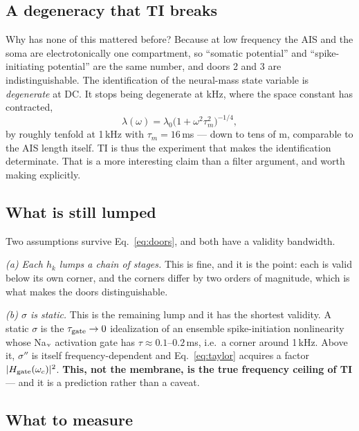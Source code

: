 \documentclass[11pt,a4paper]{article}
\begin{document}
\subsection{A degeneracy that TI breaks}

Why has none of this mattered before? Because at low frequency the AIS and the soma are electrotonically
one compartment, so ``somatic potential'' and ``spike-initiating potential'' are the same number, and
doors 2 and 3 are indistinguishable. The identification of the neural-mass state variable is
\emph{degenerate} at DC. It stops being degenerate at kHz, where the space constant has contracted,
\begin{equation}
\lambda(\omega)=\lambda_0\bigl(1+\omega^2\tau_m^2\bigr)^{-1/4},
\label{eq:lambda}
\end{equation}
by roughly tenfold at 1\,kHz with $\tau_m=16$\,ms --- down to tens of \textmu m, comparable to the AIS
length itself. TI is thus the experiment that makes the identification determinate. That is a more
interesting claim than a filter argument, and worth making explicitly.

\subsection{What is still lumped}

Two assumptions survive Eq.~\eqref{eq:doors}, and both have a validity bandwidth.

\emph{(a) Each $h_k$ lumps a chain of stages.} This is fine, and it is the point: each is valid below
its own corner, and the corners differ by two orders of magnitude, which is what makes the doors
distinguishable.

\emph{(b) $\sigma$ is static.} This is the remaining lump and it has the shortest validity. A static
$\sigma$ is the $\tau_{\rm gate}\rightarrow0$ idealization of an ensemble spike-initiation
nonlinearity whose Na$_{\rm v}$ activation gate has $\tau\approx0.1$--$0.2$\,ms, i.e.\ a corner around
1\,kHz. Above it, $\sigma''$ is itself frequency-dependent and Eq.~\eqref{eq:taylor} acquires a factor
$|H_{\rm gate}(\omega_c)|^2$. \textbf{This, not the membrane, is the true frequency ceiling of TI} ---
and it is a prediction rather than a caveat.

\subsection{What to measure}
\end{document}
